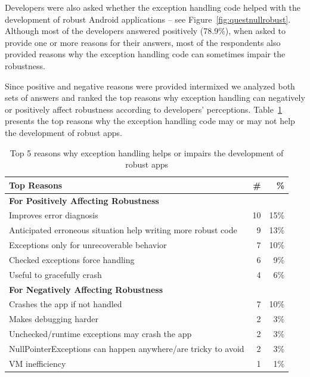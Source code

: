 \bigskip

Developers were also asked whether the exception handling code helped with the development of robust Android applications -- see Figure~\ref{fig:questnullrobust}. Although most of the developers answered positively (78.9\%), when asked to provide one or more reasons for their answers, most of the respondents also provided reasons why the exception handling code can sometimes impair the robustness.  

Since positive and negative reasons were provided intermixed we analyzed both sets of answers and ranked the top reasons why exception handling can negatively or positively affect robustness according to developers' perceptions. Table~\ref{tab:topreasons} presents the top reasons why the exception handling code may or may not help the development of robust apps. 

\begin{table}
\scriptsize
\centering
\begin{tabular}{lrr}
\hline
\bfseries{Top Reasons} & \bfseries{\#} & \bfseries{\%} \\
\hline
\bfseries{For Positively Affecting Robustness} &   &   \\
Improves error diagnosis  &	10	& 15\% \\
Anticipated erroneous situation help writing more robust code  & 9	 & 13\% \\ 
Exceptions only for unrecoverable behavior	& 7 &	10\% \\
Checked exceptions force handling  &	6	& 9\% \\
Useful to gracefully crash 	& 4 &	6\% \\
		
\bfseries{For Negatively Affecting Robustness} &   &   \\
Crashes the app if not handled	 & 7	& 10\% \\
Makes debugging harder &	2 &	3\% \\
Unchecked/runtime exceptions may crash the app & 2	& 3\% \\
NullPointerExceptions can happen anywhere/are tricky to avoid	 & 2	& 3\% \\
VM inefficiency 	& 1 & 1\% \\

\hline
\end{tabular}
\caption{Top 5 reasons why exception handling helps or impairs the development of robust apps}
\label{tab:topreasons}
\end{table}


